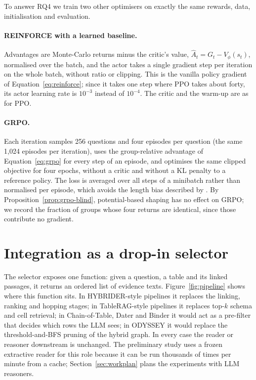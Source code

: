 To answer RQ4 we train two other optimisers on exactly the same rewards, data, initialisation and evaluation.

\paragraph{REINFORCE with a learned baseline.} Advantages are Monte-Carlo returns minus the critic's value, $\hat A_t=G_t-V_\phi(s_t)$, normalised over the batch, and the actor takes a single gradient step per iteration on the whole batch, without ratio or clipping. This is the vanilla policy gradient of Equation~\eqref{eq:reinforce}; since it takes one step where PPO takes about forty, its actor learning rate is $10^{-3}$ instead of $10^{-4}$. The critic and the warm-up are as for PPO.

\paragraph{GRPO.} Each iteration samples 256 questions and four episodes per question (the same 1{,}024 episodes per iteration), uses the group-relative advantage of Equation~\eqref{eq:grpo} for every step of an episode, and optimises the same clipped objective for four epochs, without a critic and without a KL penalty to a reference policy. The loss is averaged over all steps of a minibatch rather than normalised per episode, which avoids the length bias described by \citet{liu2025understanding}. By Proposition~\ref{prop:grpo-blind}, potential-based shaping has no effect on GRPO; we record the fraction of groups whose four returns are identical, since those contribute no gradient.

\section{Integration as a drop-in selector}
\label{sec:integration}

The selector exposes one function: given a question, a table and its linked passages, it returns an ordered list of evidence texts. Figure~\ref{fig:pipeline} shows where this function sits. In HYBRIDER-style pipelines it replaces the linking, ranking and hopping stages; in TableRAG-style pipelines it replaces top-$k$ schema and cell retrieval; in Chain-of-Table, Dater and Binder it would act as a pre-filter that decides which rows the LLM sees; in ODYSSEY it would replace the threshold-and-BFS pruning of the hybrid graph. In every case the reader or reasoner downstream is unchanged. The preliminary study uses a frozen extractive reader for this role because it can be run thousands of times per minute from a cache; Section~\ref{sec:workplan} plans the experiments with LLM reasoners.

